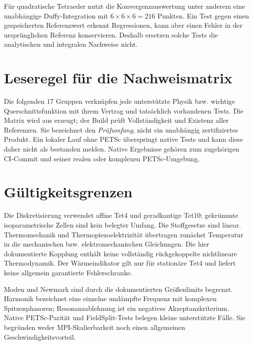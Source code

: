 Für quadratische Tetraeder nutzt die Konvergenzauswertung unter anderem eine
unabhängige Duffy-Integration mit $6\times6\times6=216$ Punkten. Ein Test gegen
einen gespeicherten Referenzwert erkennt Regressionen, kann aber einen Fehler
in der ursprünglichen Referenz konservieren. Deshalb ersetzen solche Tests
die analytischen und integralen Nachweise nicht.

\section{Leseregel für die Nachweismatrix}
Die folgenden 17 Gruppen verknüpfen jede unterstützte Physik bzw. wichtige
Querschnittsfunktion mit ihrem Vertrag und tatsächlich vorhandenen Tests.
Die Matrix wird aus  erzeugt; der
Build prüft Vollständigkeit und Existenz aller Referenzen. Sie bezeichnet den
\emph{Prüfumfang}, nicht ein unabhängig zertifiziertes Produkt.
Ein lokaler Lauf ohne PETSc überspringt native Tests und kann diese daher
nicht als bestanden melden. Native Ergebnisse gehören zum zugehörigen
CI-Commit und seiner realen oder komplexen PETSc-Umgebung.



\section{Gültigkeitsgrenzen}
Die Diskretisierung verwendet affine Tet4 und geradkantige Tet10; gekrümmte
isoparametrische Zellen sind kein belegter Umfang. Die Stoffgesetze sind linear.
Thermomechanik und Thermopiezoelektrizität übertragen zunächst Temperatur in
die mechanischen bzw. elektromechanischen Gleichungen. Die hier dokumentierte
Kopplung enthält keine vollständig rückgekoppelte nichtlineare Thermodynamik.
Der Wärmeindikator gilt nur für stationäre Tet4 und liefert keine allgemein
garantierte Fehlerschranke.

Moden und Newmark sind durch die dokumentierten Größenlimits begrenzt.
Harmonik bezeichnet eine einzelne undämpfte Frequenz mit komplexen
Spitzenphasoren; Resonanzablehnung ist ein negatives Akzeptanzkriterium.
Native PETSc-Parität und FieldSplit-Tests belegen kleine unterstützte Fälle.
Sie begründen weder MPI-Skalierbarkeit noch einen allgemeinen Geschwindigkeitsvorteil.

